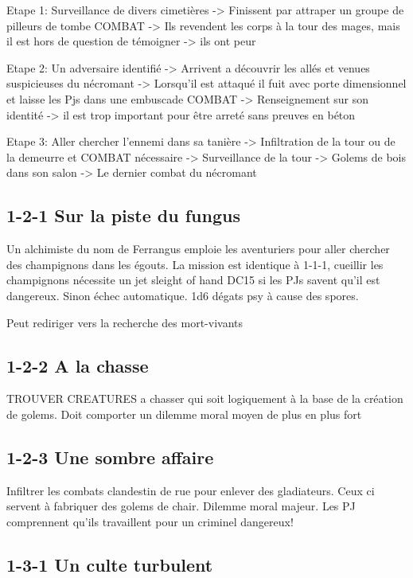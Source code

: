 Etape 1: Surveillance de divers cimetières
 -> Finissent par attraper un groupe de pilleurs de tombe COMBAT
 -> Ils revendent les corps à la tour des mages, mais il est hors de question de témoigner -> ils ont peur

Etape 2: Un adversaire identifié
 -> Arrivent a découvrir les allés et venues suspicieuses du nécromant
 -> Lorsqu'il est attaqué il fuit avec porte dimensionnel et laisse les Pjs dans une embuscade COMBAT
 -> Renseignement sur son identité -> il est trop important pour être arreté sans preuves en béton

Etape 3: Aller chercher l'ennemi dans sa tanière
 -> Infiltration de la tour ou de la demeurre et COMBAT nécessaire
 -> Surveillance de la tour
 -> Golems de bois dans son salon
 -> Le dernier combat du nécromant


\subsection*{1-2-1 Sur la piste du fungus}

Un alchimiste du nom de Ferrangus emploie les aventuriers pour aller chercher des champignons dans les
égouts. La mission est identique à 1-1-1, cueillir les champignons nécessite un jet sleight of hand DC15
si les PJs savent qu'il est dangereux. Sinon échec automatique. 1d6 dégats psy à cause des spores.

Peut rediriger vers la recherche des mort-vivants 

\subsection*{1-2-2 A la chasse}

TROUVER CREATURES a chasser qui soit logiquement à la base de la création de golems. Doit comporter
un dilemme moral moyen de plus en plus fort

\subsection*{1-2-3 Une sombre affaire}

Infiltrer les combats clandestin de rue pour enlever des gladiateurs. Ceux ci servent à fabriquer
des golems de chair. Dilemme moral majeur. Les PJ comprennent qu'ils travaillent pour un criminel
dangereux!

\subsection*{1-3-1 Un culte turbulent}

